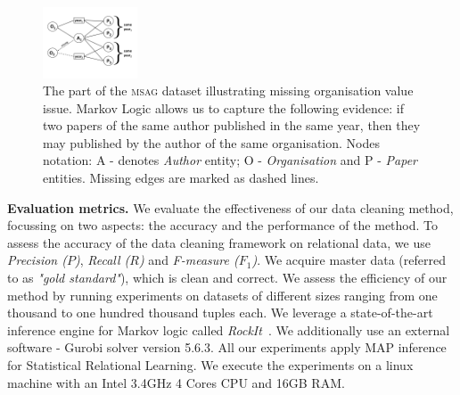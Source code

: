 \begin{figure}[t]
    \centering
    \includegraphics[width=0.25\textwidth, trim = 0mm 4mm 0mm 5mm, clip]{img/graph01.png}
    \caption{The part of the \textsc{msag} dataset illustrating missing organisation value issue. Markov Logic allows us to capture the following evidence: if two papers of the same author published in the same year, then they may published by the author of the same organisation. Nodes notation: A - denotes \textit{Author} entity; O - \textit{Organisation} and P - \textit{Paper} entities. Missing edges are marked as dashed lines.}
    \label{fig:msagmissing}
\end{figure}

\textbf{Evaluation metrics.} We evaluate the effectiveness of our data cleaning method, focussing on two aspects: the accuracy and the performance of the method. To assess the accuracy of the data cleaning framework on relational data, we use \textit{Precision ($P$)}, \textit{Recall ($R$)} and \textit{F-measure ($F_1$)}. We acquire master data (referred to as \textit{"gold standard"}), which is clean and correct. We assess the efficiency of our method by running experiments on datasets of different sizes ranging from one thousand to one hundred thousand tuples each. We leverage a state-of-the-art inference engine for Markov logic called \textit{RockIt}~\cite{NoessnerNS13}. We additionally use an external software - Gurobi solver version 5.6.3. All our experiments apply MAP inference for Statistical Relational Learning. We execute the experiments on a linux machine with an Intel 3.4GHz 4 Cores CPU and 16GB RAM.






